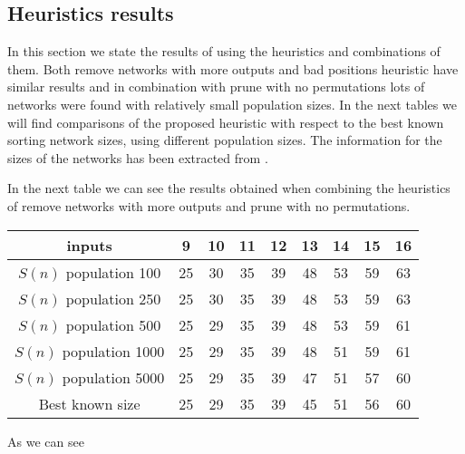 \documentclass[../main.tex]{subfiles}
\begin{document}
	\subsection{Heuristics results}
	In this section we state the results of using the heuristics and combinations of them. Both remove networks with more outputs and bad positions heuristic have similar results and in combination with prune with no permutations lots of networks were found with relatively small population sizes. In the next tables we will find comparisons of the proposed heuristic with respect to the best known sorting network sizes, using different population sizes. The information for the sizes of the networks has been extracted from \cite{bertdobbelaere}.
	
	In the next table we can see the results obtained when combining the heuristics of remove networks with more outputs and prune with no permutations. 
	\begin{center}
		\begin{tabular}{|c | c c c c c c c c|} 
			\hline
			inputs & 9 & 10 & 11 & 12 & 13 & 14 & 15 & 16  \\ [0.5ex] 
			\hline\hline
			 $S(n)$ population 100 & 25 & 30 & 35 & 39 & 48 & 53 & 59 & 63 \\ [1ex]
			\hline
			$S(n)$ population 250  & 25 & 30 & 35 & 39 & 48 & 53 & 59 & 63 \\  [1ex] 
			\hline
			$S(n)$ population 500 & 25 & 29 & 35 & 39 & 48 & 53 & 59 & 61 \\  [1ex] 
			\hline
			$S(n)$ population 1000  & 25 & 29 & 35 & 39 & 48 & 51 & 59 & 61 \\  [1ex] 
			\hline
			$S(n)$ population 5000  & 25 & 29 & 35 & 39 & 47 & 51 & 57 & 60 \\  [1ex] 
			\hline
			Best known size & 25 & 29 & 35 & 39 & 45 & 51 & 56 & 60 \\  [1ex] 
			\hline
		\end{tabular}
	\end{center}

	As we can see 
\end{document}
